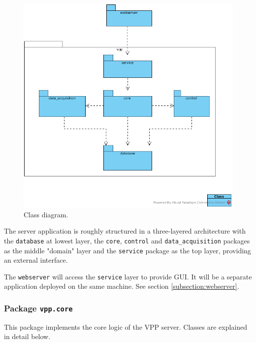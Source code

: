 \begin{figure}[H]
    \centering
    \includegraphics[width=\textwidth]{figures/class_overview}
    \caption{Class diagram. }
    \label{figureClassDiagram}
\end{figure}

The server application is roughly structured in a three-layered architecture with the \texttt{database} at lowest layer, the \texttt{core}, \texttt{control} and \texttt{data\_acquisition} packages as the middle "domain" layer and the \texttt{service} package as the top layer, providing an external interface. 

The \texttt{webserver} will access the \texttt{service} layer to provide GUI. It will be a separate application deployed on the same machine. See section \ref{subsection:webserver}.



\subsubsection{Package \texttt{vpp.core}}
This package implements the core logic of the VPP server. Classes are explained in detail below.

